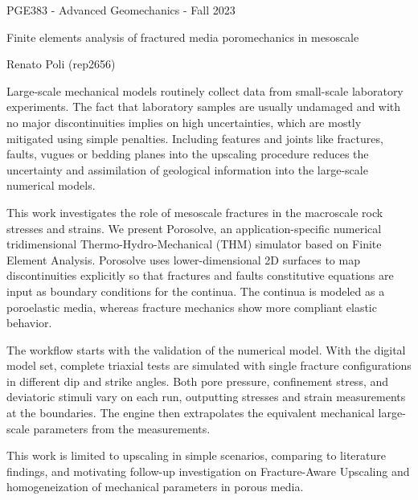 \documentclass[a4paper]{article}
\begin{document}

\normalsize
 \begin{center}
PGE383 - Advanced Geomechanics - Fall 2023
 \end{center}
\Large
 \begin{center}
\vspace{30pt}
Finite elements analysis of fractured media poromechanics in mesoscale

\hspace{10pt}

\large
Renato Poli (rep2656) \\

\hspace{10pt}

\end{center}

\hspace{10pt}

\normalsize

Large-scale mechanical models routinely collect data from small-scale laboratory experiments.
The fact that laboratory samples are usually undamaged and with no major discontinuities implies on high uncertainties, which are mostly mitigated using simple penalties. Including features and joints like fractures, faults, vugues or bedding planes into the upscaling procedure reduces the uncertainty and assimilation of geological information into the large-scale numerical models.

This work investigates the role of mesoscale fractures in the macroscale rock stresses and strains. We present Porosolve, an application-specific numerical tridimensional Thermo-Hydro-Mechanical (THM) simulator based on Finite Element Analysis. Porosolve uses lower-dimensional 2D surfaces to map discontinuities explicitly so that fractures and faults constitutive equations are input as boundary conditions for the continua. The continua is modeled as a poroelastic media, whereas fracture mechanics show more compliant elastic behavior. 

The workflow starts with the validation of the numerical model. With the digital model set, complete triaxial tests are simulated with single fracture configurations in different dip and strike angles. Both pore pressure, confinement stress, and deviatoric stimuli vary on each run, outputting stresses and strain measurements at the boundaries. The engine then extrapolates the equivalent mechanical large-scale parameters from the measurements.

This work is limited to upscaling in simple scenarios, comparing to literature findings, and motivating follow-up investigation on Fracture-Aware Upscaling and homogeneization of mechanical parameters in porous media.
\end{document}
